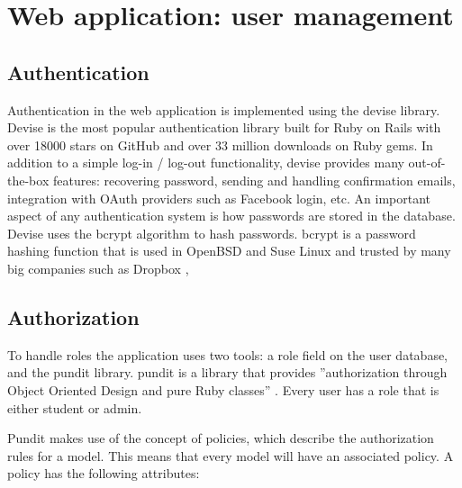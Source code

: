 \section{Web application: user management}
\subsection{Authentication}
Authentication in the web application is implemented using the devise library. Devise is the most popular authentication library built for Ruby on Rails with over 18000 stars on GitHub and over 33 million downloads on Ruby gems. In addition to a simple log-in / log-out functionality, devise provides many out-of-the-box features: recovering password, sending and handling confirmation emails, integration with OAuth providers such as Facebook login, etc. An important aspect of any authentication system is how passwords are stored in the database. Devise uses the bcrypt algorithm to hash passwords. bcrypt is a password hashing function \citep{wiki:bcrypt} that is used in OpenBSD and Suse Linux and trusted by many big companies such as Dropbox \citep{dropbox:authentication},

\subsection{Authorization}
To handle roles the application uses two tools: a role field on the user database, and the pundit library. pundit is a library that provides ''authorization through Object Oriented Design and pure Ruby classes'' \citep{github:pundit}. Every user has a role that is either student or admin.

Pundit makes use of the concept of policies, which describe the authorization rules for a model. This means that every model will have an associated policy. A policy has the following attributes:

